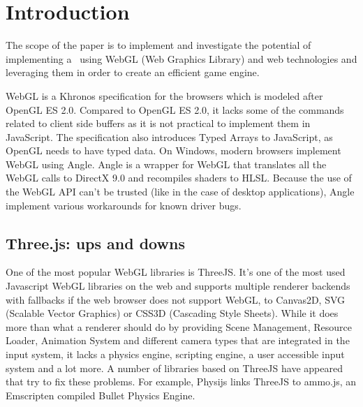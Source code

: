 \chapter{Introduction}
\label{chapter:intro}

The scope of the paper is to implement and investigate the potential of implementing a
\project\ using WebGL (Web Graphics Library) and web technologies and leveraging them in order to create an efficient game engine.

WebGL is a Khronos specification for the browsers which is modeled after OpenGL ES 2.0. Compared to OpenGL ES 2.0, it lacks some of the commands related to client side buffers as it is not practical to implement them in JavaScript. The specification also introduces Typed Arrays to JavaScript, as OpenGL needs to have typed data. On Windows, modern browsers implement WebGL using Angle. Angle is a wrapper for WebGL that translates all the WebGL calls to DirectX 9.0 and recompiles shaders to HLSL. Because the use of the WebGL API can't be trusted (like in the case of desktop applications), Angle implement various workarounds for known driver bugs.



\section{Three.js: ups and downs}
\label{sec: ThreeJs}

One of the most popular WebGL libraries is ThreeJS. It’s one of the most used Javascript WebGL libraries on the web and supports multiple renderer backends with fallbacks if the web browser does not support WebGL, to Canvas2D, SVG (Scalable Vector Graphics) or CSS3D (Cascading Style Sheets). 
While it does more than what a renderer should do by providing Scene Management,
Resource Loader, Animation System and different camera types that are integrated in the
input system, it lacks a physics engine, scripting engine, a user accessible input system and a lot more.
A number of libraries based on ThreeJS have appeared that try to fix these problems. For example, Physijs links ThreeJS to ammo.js, an Emscripten compiled Bullet Physics Engine.


